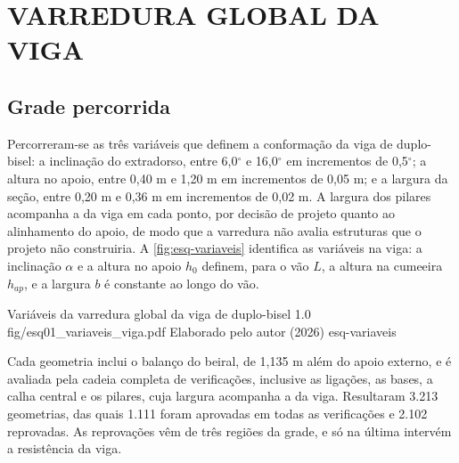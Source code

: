 
\section{VARREDURA GLOBAL DA VIGA}\label{sec:varredura-global}

\subsection{Grade percorrida}\label{ssec:grade}

Percorreram-se as três variáveis que definem a conformação da viga de
duplo-bisel: a inclinação do extradorso, entre 6,0$^{\circ}$ e 16,0$^{\circ}$ em
incrementos de 0,5$^{\circ}$; a altura no apoio, entre 0,40 m e 1,20 m em
incrementos de 0,05 m; e a largura da seção, entre 0,20 m e 0,36 m em
incrementos de 0,02 m. A largura dos pilares acompanha a da viga em cada ponto,
por decisão de projeto quanto ao alinhamento do apoio, de modo que a varredura
não avalia estruturas que o projeto não construiria. A \autoref{fig:esq-variaveis}
identifica as variáveis na viga: a inclinação $\alpha$ e a altura no apoio $h_0$
definem, para o vão $L$, a altura na cumeeira $h_{ap}$, e a largura $b$ é constante
ao longo do vão.

\figura
{Variáveis da varredura global da viga de duplo-bisel}
{1.0}
{fig/esq01_variaveis_viga.pdf}
{Elaborado pelo autor (2026)}
{esq-variaveis}
{}
{}

Cada geometria inclui o balanço do beiral, de 1,135 m além do apoio externo, e
é avaliada pela cadeia completa de verificações, inclusive as ligações, as bases,
a calha central e os pilares, cuja largura acompanha a da viga. Resultaram 3.213
geometrias, das quais 1.111 foram aprovadas em todas as verificações e 2.102
reprovadas. As reprovações vêm de três regiões da grade, e só na última intervém a
resistência da viga.

